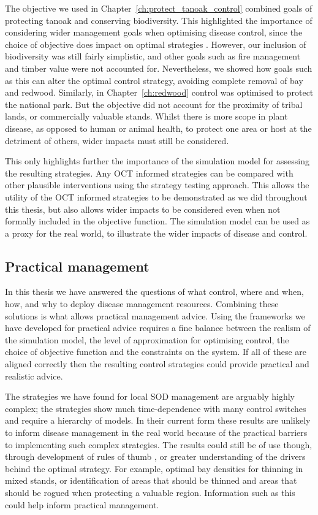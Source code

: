The objective we used in Chapter~\ref{ch:protect_tanoak_control} combined goals of protecting tanoak and conserving biodiversity. This highlighted the importance of considering wider management goals when optimising disease control, since the choice of objective does impact on optimal strategies \citep{probert_decision_2016}. However, our inclusion of biodiversity was still fairly simplistic, and other goals such as fire management and timber value were not accounted for. Nevertheless, we showed how goals such as this can alter the optimal control strategy, avoiding complete removal of bay and redwood. Similarly, in Chapter~\ref{ch:redwood} control was optimised to protect the national park. But the objective did not account for the proximity of tribal lands, or commercially valuable stands. Whilst there is more scope in plant disease, as opposed to human or animal health, to protect one area or host at the detriment of others, wider impacts must still be considered.

This only highlights further the importance of the simulation model for assessing the resulting strategies. Any OCT informed strategies can be compared with other plausible interventions using the strategy testing approach. This allows the utility of the OCT informed strategies to be demonstrated as we did throughout this thesis, but also allows wider impacts to be considered even when not formally included in the objective function. The simulation model can be used as a proxy for the real world, to illustrate the wider impacts of disease and control.

\subsection{Practical management}

In this thesis we have answered the questions of what control, where and when, how, and why to deploy disease management resources. Combining these solutions is what allows practical management advice. Using the frameworks we have developed for practical advice requires a fine balance between the realism of the simulation model, the level of approximation for optimising control, the choice of objective function and the constraints on the system. If all of these are aligned correctly then the resulting control strategies could provide practical and realistic advice.

The strategies we have found for local SOD management are arguably highly complex; the strategies show much time-dependence with many control switches and require a hierarchy of models. In their current form these results are unlikely to inform disease management in the real world because of the practical barriers to implementing such complex strategies. The results could still be of use though, through development of rules of thumb \citep[e.g.][]{parnell_early_2015,hyatt-twynam_risk-based_2017}, or greater understanding of the drivers behind the optimal strategy. For example, optimal bay densities for thinning in mixed stands, or identification of areas that should be thinned and areas that should be rogued when protecting a valuable region. Information such as this could help inform practical management.

